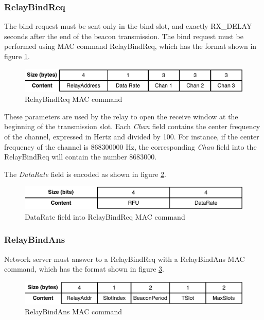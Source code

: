 \subsubsection{RelayBindReq}

The bind request must be sent only in the bind slot, and exactly RX\_DELAY seconds after the end of the beacon transmission. The bind request must be performed using MAC command RelayBindReq, which has the format shown in figure \ref{fig:relaybindreq}.

\begin{figure}[!h]
\centering
\includegraphics[width=\textwidth]{img/commands/RelayBindReq}
\caption{RelayBindReq MAC command}
\label{fig:relaybindreq}
\end{figure}

These parameters are used by the relay to open the receive window at the beginning of the transmission slot. Each \emph{Chan} field contains the center frequency of the channel, expressed in Hertz and divided by 100. For instance, if the center frequency of the channel is 868300000 Hz, the corresponding \emph{Chan} field into the RelayBindReq will contain the number 8683000.

The \emph{DataRate} field is encoded as shown in figure \ref{fig:datarate}.

\begin{figure}[!h]
\centering
\includegraphics[width=\textwidth]{img/commands/DataRate}
\caption{DataRate field into RelayBindReq MAC command}
\label{fig:datarate}
\end{figure}

\subsubsection{RelayBindAns}
Network server must answer to a RelayBindReq with a RelayBindAns MAC command, which has the format shown in figure \ref{fig:relaybindans}.

\begin{figure}[!h]
\centering
\includegraphics[width=\textwidth]{img/commands/RelayBindAns}
\caption{RelayBindAns MAC command}
\label{fig:relaybindans}
\end{figure}


